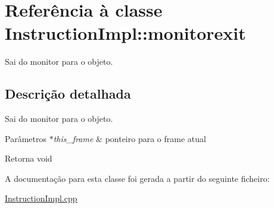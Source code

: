 \hypertarget{class_instruction_impl_1_1monitorexit}{}\section{Referência à classe Instruction\+Impl\+:\+:monitorexit}
\label{class_instruction_impl_1_1monitorexit}


Sai do monitor para o objeto.  




\subsection{Descrição detalhada}
Sai do monitor para o objeto. 


\begin{DoxyParams}{Parâmetros}
{\em $\ast$this\+\_\+frame} & ponteiro para o frame atual \\
\hline
\end{DoxyParams}
\begin{DoxyReturn}{Retorna}
void 
\end{DoxyReturn}


A documentação para esta classe foi gerada a partir do seguinte ficheiro\+:\begin{DoxyCompactItemize}
\item 
\hyperlink{_instruction_impl_8cpp}{Instruction\+Impl.\+cpp}\end{DoxyCompactItemize}
